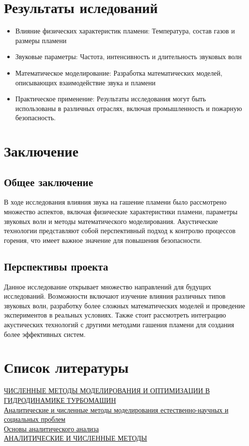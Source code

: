 \documentclass[a4paper,12pt]{article}
\begin{document}
\section{Результаты иследований}
\begin{itemize}
    \item Влияние физических характеристик пламени: Температура, состав газов и размеры пламени
    \item Звуковые параметры: Частота, интенсивность и длительность звуковых волн
    \item Математическое моделирование: Разработка математических моделей, описывающих взаимодействие звука и пламени
    \item Практическое применение: Результаты исследования могут быть использованы в различных отраслях, включая промышленность и пожарную безопасность.
\end{itemize}
\section{Заключение}
\subsection{Общее заключение}
В ходе исследования влияния звука на гашение пламени было рассмотрено множество аспектов, включая физические характеристики пламени, параметры звуковых волн и методы математического моделирования. Акустические технологии представляют собой перспективный подход к контролю процессов горения, что имеет важное значение для повышения безопасности.
\subsection{Перспективы проекта}
Данное исследование открывает множество направлений для будущих исследований. Возможности включают изучение влияния различных типов звуковых волн, разработку более сложных математических моделей и проведение экспериментов в реальных условиях. Также стоит рассмотреть интеграцию акустических технологий с другими методами гашения пламени для создания более эффективных систем.
\newpage
\section*{Список литературы}
 \href{http://www.ict.nsc.ru/sites/default/files/discouncil/Enlist/Oold_Ref/cherny.pdf}{ЧИСЛЕННЫЕ МЕТОДЫ МОДЕЛИРОВАНИЯ И ОПТИМИЗАЦИИ В ГИДРОДИНАМИКЕ ТУРБОМАШИН}\\
 \href{https://dep_vipm.pnzgu.ru/files/dep_vipm.pnzgu.ru/konference/achmm2016.pdf}{Аналитические и численные методы моделирования естественно-научных и социальных проблем}\\
 \href{https://staff.tiiame.uz/storage/users/4/books/Ghrf3Zz0xenlYSpVTogElcVOyHxu97JG4NOr1Qwu.pdf}{Основы аналитического анализа}\\
 \href{https://kpfu.ru/staff_files/F1845062855/Analiticheskie.i.chislennye.metody.pdf}{АНАЛИТИЧЕСКИЕ И ЧИСЛЕННЫЕ МЕТОДЫ}\\



\end{document}
